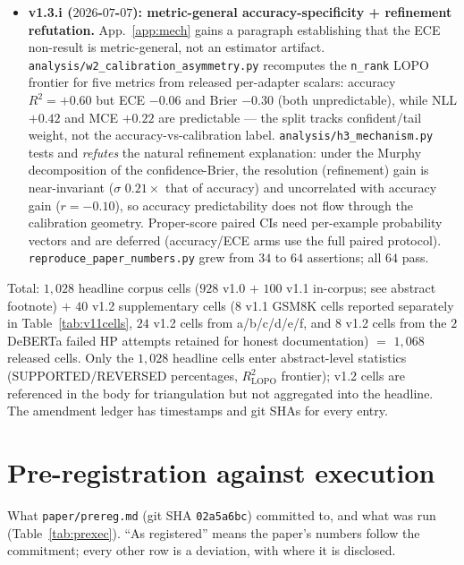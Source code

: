 \documentclass[11pt]{article}
\begin{document}
\begin{itemize}[leftmargin=*]
\item \textbf{v1.3.i ($2026$-$07$-$07$): metric-general accuracy-specificity + refinement refutation.} App.~\ref{app:mech} gains a paragraph establishing that the ECE non-result is metric-general, not an estimator artifact. \texttt{analysis/\allowbreak w2\_\allowbreak calibration\_\allowbreak asymmetry.\allowbreak py} recomputes the \texttt{n\_rank} LOPO frontier for five metrics from released per-adapter scalars: accuracy $R^2{=}{+}0.60$ but ECE $-0.06$ and Brier $-0.30$ (both unpredictable), while NLL $+0.42$ and MCE $+0.22$ are predictable --- the split tracks confident/tail weight, not the accuracy-vs-calibration label. \texttt{analysis/\allowbreak h3\_\allowbreak mechanism.\allowbreak py} tests and \emph{refutes} the natural refinement explanation: under the Murphy decomposition of the confidence-Brier, the resolution (refinement) gain is near-invariant ($\sigma$ $0.21{\times}$ that of accuracy) and uncorrelated with accuracy gain ($r{=}{-}0.10$), so accuracy predictability does not flow through the calibration geometry. Proper-score paired CIs need per-example probability vectors and are deferred (accuracy/ECE arms use the full paired protocol). \texttt{reproduce\_\allowbreak paper\_\allowbreak numbers.\allowbreak py} grew from $34$ to $64$ assertions; all $64$ pass.
\end{itemize}
Total: $1{,}028$ headline corpus cells ($928$ v1.0 $+$ $100$ v1.1 in-corpus; see abstract footnote) $+$ $40$ v1.2 supplementary cells ($8$ v1.1 GSM8K cells reported separately in Table~\ref{tab:v11cells}, $24$ v1.2 cells from a/b/c/d/e/f, and $8$ v1.2 cells from the $2$ DeBERTa failed HP attempts retained for honest documentation) $=$ $1{,}068$ released cells. Only the $1{,}028$ headline cells enter abstract-level statistics (SUPPORTED/REVERSED percentages, $R^2_{\text{LOPO}}$ frontier); v1.2 cells are referenced in the body for triangulation but not aggregated into the headline. The amendment ledger has timestamps and git SHAs for every entry.

\section{Pre-registration against execution}\label{app:prexec}
What \texttt{paper/\allowbreak prereg.md} (git SHA \texttt{02a5a6bc}) committed to, and what was run (Table~\ref{tab:prexec}). ``As registered'' means the paper's numbers follow the commitment; every other row is a deviation, with where it is disclosed.
\end{document}
